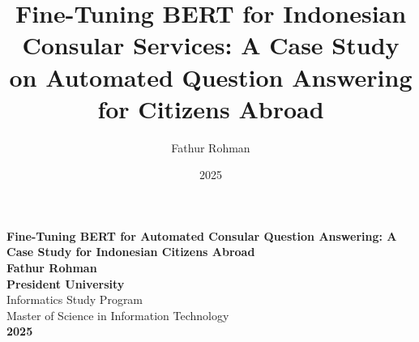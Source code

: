 \documentclass[a4paper,12pt]{report}
\title{Fine-Tuning BERT for Indonesian Consular Services: A Case Study on Automated Question Answering for Citizens Abroad}
\author{Fathur Rohman}
\date{2025}
\begin{document}
\sloppy
\begin{titlepage}
    \begin{center}
        \vspace*{2cm} %

        {\LARGE \textbf{Fine-Tuning BERT for Automated Consular Question Answering: A Case Study for Indonesian Citizens Abroad}} \\[1.5cm]

        \textbf{Fathur Rohman} \\[1.5cm]

        \vspace{5cm} %
        \textbf{President University} \\[0.5em]
        Informatics Study Program \\[0.5em]
        Master of Science in Information Technology \\[1.5cm]

        \textbf{2025}
    \end{center}
\end{titlepage}
\end{document}
